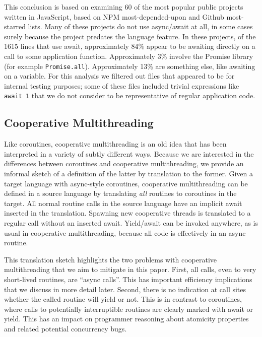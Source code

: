 \documentclass[a4paper,UKenglish,cleveref, autoref]{lipics-v2019}
\begin{document}
This conclusion is based on examining 60 of the most popular public projects written in JavaScript, based on NPM most-depended-upon and Github most-starred lists.
Many of these projects do not use async{\slash}await at all, in some cases surely because the project predates the language feature.
In these projects, of the 1615 lines that use await, approximately 84\% appear to be awaiting directly on a call to some application function.
Approximately 3\% involve the Promise library (for example \texttt{Promise.all}).
Approximately 13\% are something else, like awaiting on a variable.
For this analysis we filtered out files that appeared to be for internal testing purposes; some of these files included trivial expressions like \texttt{await 1} that we do not consider to be representative of regular application code.


\subsection{Cooperative Multithreading}

Like coroutines, cooperative multithreading is an old idea that has been interpreted in a variety of subtly different ways.
Because we are interested in the differences between coroutines and cooperative multithreading, we provide an informal sketch of a definition of the latter by translation to the former.
Given a target language with async-style coroutines, cooperative multithreading can be defined in a source language by translating \emph{all} routines to coroutines in the target.
All normal routine calls in the source language have an implicit await inserted in the translation.
Spawning new cooperative threads is translated to a regular call without an inserted await.
Yield{\slash}await can be invoked anywhere, as is usual in cooperative multithreading, because all code is effectively in an async routine.

This translation sketch highlights the two problems with cooperative multithreading that we aim to mitigate in this paper.
First, all calls, even to very short-lived routines, are ``async calls''.
This has important efficiency implications that we discuss in more detail later.
Second, there is no indication at call sites whether the called routine will yield or not.
This is in contrast to coroutines, where calls to potentially interruptible routines are clearly marked with await or yield.
This has an impact on programmer reasoning about atomicity properties and related potential concurrency bugs.
\end{document}
